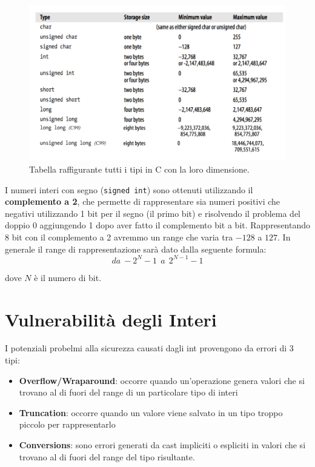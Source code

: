 \begin{figure}[H]
    \centering
    \includegraphics[width=13cm, keepaspectratio]{capitoli/secure_coding/img/cap_2/vari_tipi.png}
    \caption{Tabella raffigurante tutti i tipi in C con la loro dimensione.}\label{fig:vari_tipi}
\end{figure}

I numeri interi con segno (\verb|signed int|) sono ottenuti utilizzando il \textbf{complemento a 2}, che permette di rappresentare sia numeri positivi
che negativi utilizzando 1 bit per il segno (il primo bit) e risolvendo il problema del doppio 0 aggiungendo 1 dopo aver fatto il complemento bit a bit.
Rappresentando 8 bit con il complemento a 2 avremmo un range che varia tra $-128$ a $127$.
In generale il range di rappresentazione sarà dato dalla seguente formula:
\[
    da \ -2^{N} - 1 \ \ a \ \ 2^{N - 1} - 1
\]

dove $N$ è il numero di bit.


\section{Vulnerabilità degli Interi}

I potenziali probelmi alla sicurezza causati dagli int provengono da errori di 3 tipi:

\begin{itemize}
    \item \textbf{Overflow/Wraparound}: occorre quando un'operazione genera valori
          che si trovano al di fuori del range di un particolare tipo di interi
    \item \textbf{Truncation}: occorre quando un valore viene salvato in un tipo
          troppo piccolo per rappresentarlo
    \item \textbf{Conversions}: sono errori generati da cast impliciti o espliciti
          in valori che si trovano al di fuori del range del tipo risultante.
\end{itemize}

